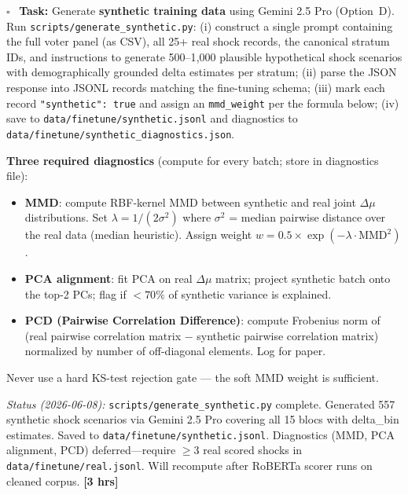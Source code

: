 \documentclass[11pt]{article}
\newcommand{\hrs}[1]{\textbf{[#1 hrs]}}
\newcommand{\task}[2]{%
  \noindent\textbf{Task:} #1 \hfill \hrs{#2}\\}
\newcommand{\done}{\textcolor{sectionblue}{$\square$}\ }
\begin{document}
\begin{taskbox}
\done \task{Generate \textbf{synthetic training data} using Gemini 2.5 Pro
  (Option~D). Run \texttt{scripts/generate\_synthetic.py}: (i) construct
  a single prompt containing the full voter panel (as CSV), all 25+ real shock
  records, the canonical stratum IDs, and instructions to generate 500--1{,}000
  plausible hypothetical shock scenarios with demographically grounded delta
  estimates per stratum; (ii) parse the JSON response into JSONL records matching
  the fine-tuning schema; (iii) mark each record \texttt{"synthetic": true}
  and assign an \texttt{mmd\_weight} per the formula below; (iv) save to
  \texttt{data/finetune/synthetic.jsonl} and diagnostics to
  \texttt{data/finetune/synthetic\_diagnostics.json}.

  \textbf{Three required diagnostics} (compute for every batch; store in diagnostics file):
  \begin{itemize}[leftmargin=1.4em, itemsep=1pt]
    \item \textbf{MMD}: compute RBF-kernel MMD between synthetic and real joint
          $\Delta\mu$ distributions. Set $\lambda = 1/(2\sigma^2)$ where
          $\sigma^2$ = median pairwise distance over the real data (median heuristic).
          Assign weight $w = 0.5 \times \exp(-\lambda \cdot \text{MMD}^2)$.
    \item \textbf{PCA alignment}: fit PCA on real $\Delta\mu$ matrix; project
          synthetic batch onto the top-2 PCs; flag if $< 70\%$ of synthetic
          variance is explained.
    \item \textbf{PCD (Pairwise Correlation Difference)}: compute Frobenius norm
          of (real pairwise correlation matrix $-$ synthetic pairwise correlation
          matrix) normalized by number of off-diagonal elements. Log for paper.
  \end{itemize}
  Never use a hard KS-test rejection gate --- the soft MMD weight is sufficient.

  \smallskip\textit{Status (2026-06-08):} \texttt{scripts/generate\_synthetic.py}
  complete. Generated 557 synthetic shock scenarios via Gemini 2.5 Pro covering all
  15 blocs with delta\_bin estimates. Saved to \texttt{data/finetune/synthetic.jsonl}.
  Diagnostics (MMD, PCA alignment, PCD) deferred---require $\geq$3 real scored shocks
  in \texttt{data/finetune/real.jsonl}. Will recompute after RoBERTa scorer runs on
  cleaned corpus.}{3}


\end{taskbox}
\end{document}
